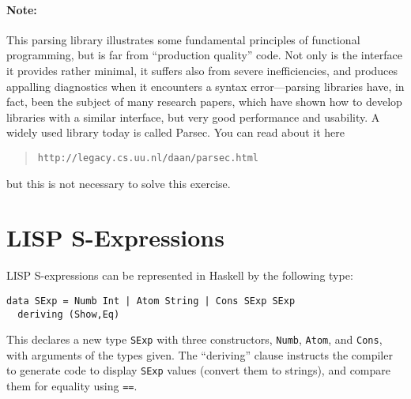 \documentclass{article}
\newcommand{\percents}[1]{\protect \marginpar[l]{\bf [#1 points]}}
\begin{document}
\paragraph{Note:} This parsing library illustrates some fundamental
principles of functional programming, but is far from ``production
quality'' code. Not only is the interface it provides rather minimal,
it suffers also from severe inefficiencies, and produces appalling
diagnostics when it encounters a syntax error---parsing libraries
have, in fact, been the subject of many research papers, which have
shown how to develop libraries with a similar interface, but very good
performance and usability. A widely used library today is
called Parsec. You can read about it here
\begin{quote}
\texttt{http://legacy.cs.uu.nl/daan/parsec.html}
\end{quote}
but this is not necessary to solve this exercise.


\section{LISP S-Expressions}
\percents{0}
LISP S-expressions can be represented in Haskell by the following
type:
\begin{verbatim}
data SExp = Numb Int | Atom String | Cons SExp SExp
  deriving (Show,Eq)
\end{verbatim}
This declares a new type \texttt{SExp} with three constructors,
\texttt{Numb}, \verb!Atom!, and \verb!Cons!, with arguments of the types
given. The ``deriving'' clause instructs the compiler to generate code
to display \verb!SExp! values (convert them to strings), and compare
them for equality using \verb!==!.
\end{document}
